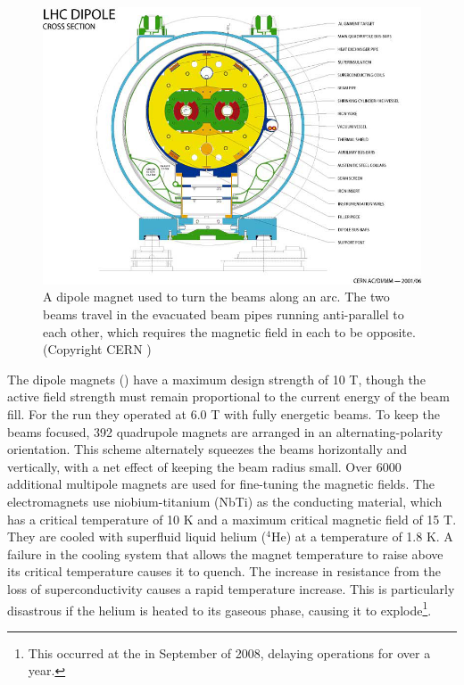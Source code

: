 \begin{figure}[t]
\includegraphics{LHC-PHO-2001-187.jpg}
\caption{A dipole magnet used to turn the beams along an arc. The two beams travel in the evacuated beam pipes running anti-parallel to each other, which requires the magnetic field in each to be opposite. (Copyright CERN \cite{Valeriane:843195})}
\label{fig:dipole_cross_section}
\end{figure}

The dipole magnets () have a maximum design strength of 10 T, though the active field strength must remain proportional to the current energy of the beam fill.
For the \pPbenergy \pPb run they operated at 6.0 T with fully energetic beams.
To keep the beams focused, 392 quadrupole magnets are arranged in an alternating-polarity orientation.
This scheme alternately squeezes the beams horizontally and vertically, with a net effect of keeping the beam radius small.
Over 6000 additional multipole magnets are used for fine-tuning the magnetic fields.
The electromagnets use niobium-titanium (NbTi) as the conducting material, which has a critical temperature of 10 K and a maximum critical magnetic field of 15 T.
They are cooled with superfluid liquid helium (${}^{4}\textrm{He}$) at a temperature of 1.8 K.
A failure in the cooling system that allows the magnet temperature to raise above its critical temperature causes it to quench.
The increase in resistance from the loss of superconductivity causes a rapid temperature increase.
This is particularly disastrous if the helium is heated to its gaseous phase, causing it to explode\footnote{This occurred at the \lhc in September of 2008, delaying operations for over a year.}.


